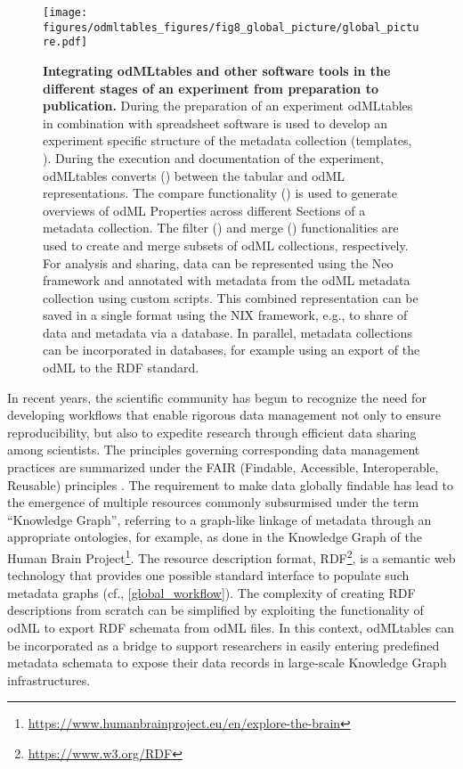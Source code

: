 \begin{figure}[h!]
\begin{center}
\texttt{[image: figures/odmltables\_figures/fig8\_global\_picture/global\_picture.pdf]}
\caption{\label{fig:global_workflow}
\textbf{Integrating odMLtables and other software tools in the different stages of an experiment from preparation to publication.} During the preparation of an experiment odMLtables in combination with spreadsheet software is used to develop an experiment specific structure of the metadata collection (templates, \fgenerate{}). During the execution and documentation of the experiment, odMLtables converts (\fconvert{}) between the tabular and odML representations. The compare functionality (\fcompare{}) is used to generate overviews of odML Properties across different Sections of a metadata collection. The filter (\ffilter{}) and merge (\fmerge{}) functionalities are used to create and merge subsets of odML collections, respectively. For analysis and sharing, data can be represented using the Neo framework and annotated with metadata from the odML metadata collection using custom scripts. This combined representation can be saved in a single format using the NIX framework, e.g., to share of data and metadata via a database. In parallel, metadata collections can be incorporated in databases, for example using an export of the odML to the RDF standard.}
\end{center}
\end{figure}

In recent years, the scientific community has begun to recognize the need for developing workflows that enable rigorous data management not only to ensure reproducibility, but also to expedite research through efficient data sharing among scientists. The principles governing corresponding data management practices are summarized under the FAIR (Findable, Accessible, Interoperable, Reusable) principles \citep{Wilkinson16_160018}. The requirement to make data globally findable has lead to the emergence of multiple resources commonly subsurmised under the term ``Knowledge Graph'', referring to a graph-like linkage of metadata through an appropriate ontologies, for example, as done in the Knowledge Graph of the Human Brain Project\footnote{\url{https://www.humanbrainproject.eu/en/explore-the-brain}}. The resource description format, RDF\footnote{\url{https://www.w3.org/RDF}}, is a semantic web technology that provides one possible standard interface to populate such metadata graphs (cf., \cref{global_workflow}). The complexity of creating RDF descriptions from scratch can be simplified by exploiting the functionality of odML to export RDF schemata from odML files. In this context, odMLtables can be incorporated as a bridge to support researchers in easily entering predefined metadata schemata to expose their data records in large-scale Knowledge Graph infrastructures.

